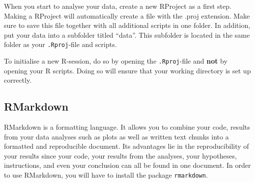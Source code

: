 \documentclass[
  letterpaper,
  DIV=11,
  numbers=noendperiod,
  oneside]{scrreprt}
\begin{document}
\begin{tcolorbox}[enhanced jigsaw, arc=.35mm, left=2mm, breakable, toprule=.15mm, opacityback=0, colframe=quarto-callout-tip-color-frame, colback=white, rightrule=.15mm, bottomrule=.15mm, leftrule=.75mm]
\begin{minipage}[t]{5.5mm}
\textcolor{quarto-callout-tip-color}{\faLightbulb}
\end{minipage}%
\begin{minipage}[t]{\textwidth - 5.5mm}

When you start to analyse your data, create a new RProject as a first
step. Making a RProject will automatically create a file with the .proj
extension. Make sure to save this file together with all additional
scripts in one folder. In addition, put your data into a subfolder
titled ``data''. This subfolder is located in the same folder as your
\texttt{.Rproj}-file and scripts.

\end{minipage}%
\end{tcolorbox}

\begin{tcolorbox}[enhanced jigsaw, arc=.35mm, left=2mm, breakable, toprule=.15mm, opacityback=0, colframe=quarto-callout-caution-color-frame, colback=white, rightrule=.15mm, bottomrule=.15mm, leftrule=.75mm]
\begin{minipage}[t]{5.5mm}
\textcolor{quarto-callout-caution-color}{\faFire}
\end{minipage}%
\begin{minipage}[t]{\textwidth - 5.5mm}

To initialise a new R-session, do so by opening the \texttt{.Rproj}-file
and \textbf{not} by opening your R scripts. Doing so will ensure that
your working directory is set up correctly.

\end{minipage}%
\end{tcolorbox}

\hypertarget{rmarkdown}{%
\subsection{RMarkdown}\label{rmarkdown}}

RMarkdown is a formatting language. It allows you to combine your code,
results from your data analyses such as plots as well as written text
chunks into a formatted and reproducible document. Its advantages lie in
the reproducibility of your results since your code, your results from
the analyses, your hypotheses, instructions, and even your conclusion
can all be found in one document. In order to use RMarkdown, you will
have to install the package \texttt{rmarkdown}.
\end{document}
